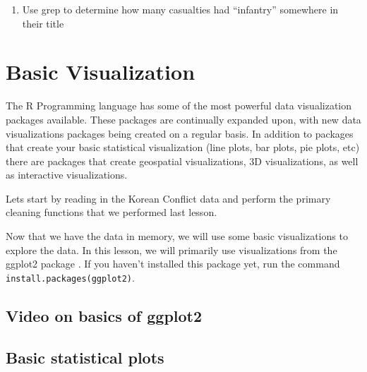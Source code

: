 \documentclass[]{book}
\newenvironment{Shaded}{\begin{snugshade}}{\end{snugshade}}
\newcommand{\KeywordTok}[1]{\textcolor[rgb]{0.13,0.29,0.53}{\textbf{{#1}}}}
\newcommand{\DataTypeTok}[1]{\textcolor[rgb]{0.13,0.29,0.53}{{#1}}}
\newcommand{\StringTok}[1]{\textcolor[rgb]{0.31,0.60,0.02}{{#1}}}
\newcommand{\OtherTok}[1]{\textcolor[rgb]{0.56,0.35,0.01}{{#1}}}
\newcommand{\NormalTok}[1]{{#1}}
\providecommand{\tightlist}{%
  \setlength{\itemsep}{0pt}\setlength{\parskip}{0pt}}
\begin{document}
\begin{enumerate}
\def\labelenumi{\arabic{enumi}.}
\tightlist
\item
  Use grep to determine how many casualties had ``infantry'' somewhere
  in their title
\end{enumerate}

\chapter{Basic Visualization}\label{basic-visualization}

The R Programming language has some of the most powerful data
visualization packages available. These packages are continually
expanded upon, with new data visualizations packages being created on a
regular basis. In addition to packages that create your basic
statistical visualization (line plots, bar plots, pie plots, etc) there
are packages that create geospatial visualizations, 3D visualizations,
as well as interactive visualizations.

Lets start by reading in the Korean Conflict data and perform the
primary cleaning functions that we performed last lesson.

\begin{Shaded}
\end{Shaded}

Now that we have the data in memory, we will use some basic
visualizations to explore the data. In this lesson, we will primarily
use visualizations from the ggplot2 package \citep{R-ggplot2}. If you
haven't installed this package yet, run the command
\texttt{install.packages(\textquotesingle{}ggplot2\textquotesingle{})}.

\section{Video on basics of ggplot2}\label{video-on-basics-of-ggplot2}

\section{Basic statistical plots}\label{basic-statistical-plots}
\end{document}
